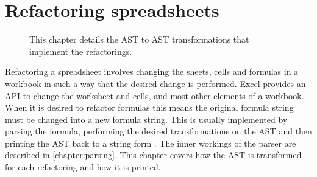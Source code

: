 \documentclass[12pt,a4paper,onecolumn,oneside,parskip]{memoir}
\newcommand{\todo}[1]{\textbf{TODO: #1}}
\begin{document}
%
%
%
%
%
%
%
%



\chapter{Refactoring spreadsheets}
\label{chapter:implementingrefactorings}

\noindent
\begin{figure}[h!]
\hspace*{0.003\textwidth}

\caption{This chapter details the AST to AST transformations that implement the refactorings.}
\end{figure}

Refactoring a spreadsheet involves changing the sheets, cells and formulas in a workbook in such a way that the desired change is performed.
Excel provides an API to change the worksheet and cells, and most other elements of a workbook.
When it is desired to refactor formulas this means the original formula string must be changed into a new formula string.
This is usually implemented by parsing the formula, performing the desired transformations on the AST and then printing the AST back to a string form \cite{fowler1999refactoring}.
The inner workings of the parser are described in \ref{chapter:parsing}.
This chapter covers how the AST is transformed for each refactoring and how it is printed.
\end{document}

